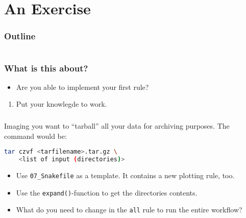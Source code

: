 \section{An Exercise}

\begin{frame}
    \frametitle{Outline}
    \begin{columns}[t]
        \begin{column}{.5\textwidth}
            \tableofcontents[sections={1-9},currentsection]
        \end{column}
        \begin{column}{.5\textwidth}
            \tableofcontents[sections={10-18},currentsection]
        \end{column}
    \end{columns}
\end{frame}

\begin{frame}
  \frametitle{What is this about?}
   \begin{question}[Questions]
   	  \begin{itemize}
         \item Are you able to implement your first rule?
      \end{itemize}
   \end{question}
   \begin{docs}[Objectives]
   	 \begin{enumerate}
        \item Put your knowlegde to work.
     \end{enumerate}
   \end{docs}
\end{frame}  

\begin{frame}[fragile]
  \frametitle{}
  Imaging you want to ``tarball'' all your data for archiving purposes. The command would be:
  \begin{lstlisting}[language=Bash, style=Shell]
tar czvf <tarfilename>.tar.gz \
    <list of input (directories)>
  \end{lstlisting}
  \pause
  \begin{hint}[Hints]
  	 \begin{itemize}
       \item Use \texttt{07\_Snakefile} as a template. It contains a new plotting rule, too.
       \item Use the \texttt{expand()}-function to get the directories contents.
       \item What do you need to change in the \texttt{all} rule to run the entire workflow?
     \end{itemize}
   \end{hint}
\end{frame}
